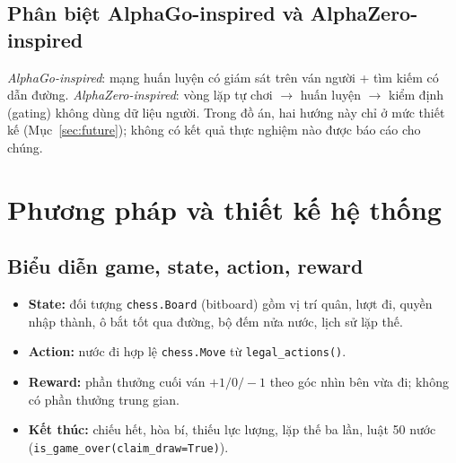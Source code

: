 \documentclass[13pt,a4paper]{extreport}
\newcommand{\code}[1]{\texttt{#1}}
\begin{document}
\section{Phân biệt AlphaGo-inspired và AlphaZero-inspired}
\emph{AlphaGo-inspired}: mạng huấn luyện có giám sát trên ván người + tìm kiếm có dẫn đường. \emph{AlphaZero-inspired}: vòng lặp tự chơi $\to$ huấn luyện $\to$ kiểm định (gating) không dùng dữ liệu người. Trong đồ án, hai hướng này chỉ ở mức thiết kế (Mục~\ref{sec:future}); không có kết quả thực nghiệm nào được báo cáo cho chúng.

\chapter{Phương pháp và thiết kế hệ thống}
\section{Biểu diễn game, state, action, reward}
\begin{itemize}
\item \textbf{State:} đối tượng \code{chess.Board} (bitboard) gồm vị trí quân, lượt đi, quyền nhập thành, ô bắt tốt qua đường, bộ đếm nửa nước, lịch sử lặp thế.
\item \textbf{Action:} nước đi hợp lệ \code{chess.Move} từ \code{legal\_actions()}.
\item \textbf{Reward:} phần thưởng cuối ván $+1/0/-1$ theo góc nhìn bên vừa đi; không có phần thưởng trung gian.
\item \textbf{Kết thúc:} chiếu hết, hòa bí, thiếu lực lượng, lặp thế ba lần, luật 50 nước (\code{is\_game\_over(claim\_draw=True)}).
\end{itemize}
\end{document}

